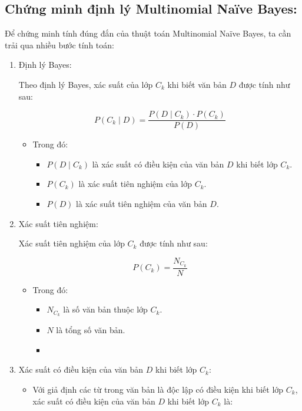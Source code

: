 \subsection{Chứng minh định lý Multinomial Naïve Bayes:}

Để chứng minh tính đúng đắn của thuật toán Multinomial Naïve Bayes, ta cần trải qua nhiều bước tính toán:

\begin{enumerate}
    \item Định lý Bayes:

Theo định lý Bayes, xác suất của lớp \( C_k \) khi biết văn bản \( D \) được tính như sau:

\[
P(C_k \mid D) = \frac{P(D \mid C_k) \cdot P(C_k)}{P(D)} \tag{1}
\]
\begin{itemize}
    \item Trong đó:
\begin{itemize}
    \item \( P(D \mid C_k) \) là xác suất có điều kiện của văn bản \( D \) khi biết lớp \( C_k \).
    \item \( P(C_k) \) là xác suất tiên nghiệm của lớp \( C_k \).
    \item \( P(D) \) là xác suất tiên nghiệm của văn bản \( D \).
\end{itemize}
\end{itemize}

    \item Xác suất tiên nghiệm:

Xác suất tiên nghiệm của lớp \( C_k \) được tính như sau:

\[
P(C_k) = \frac{N_{C_k}}{N} \tag{2}
\]
\begin{itemize}
    \item Trong đó:
\begin{itemize}
    \item \( N_{C_k} \) là số văn bản thuộc lớp \( C_k \).
    \item \( N \) là tổng số văn bản.
    \item 
\end{itemize}
\end{itemize}


    \item Xác suất có điều kiện của văn bản \( D \) khi biết lớp \( C_k \):

\begin{itemize}
    \item Với giả định các từ trong văn bản là độc lập có điều kiện khi biết lớp \( C_k \), xác suất có điều kiện của văn bản \( D \) khi biết lớp \( C_k \) là:


\end{itemize}
\end{enumerate}
